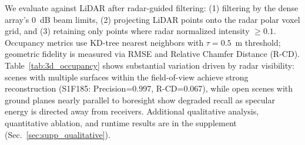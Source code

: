 We evaluate against LiDAR after radar-guided filtering: (1) filtering by the dense array's 0~dB beam limits, (2) projecting LiDAR points onto the radar polar voxel grid, and (3) retaining only points where radar normalized intensity $\geq 0.1$. Occupancy metrics use KD-tree nearest neighbors with $\tau=0.5$~m threshold; geometric fidelity is measured via RMSE and Relative Chamfer Distance (R-CD). Table~\ref{tab:3d_occupancy} shows substantial variation driven by radar visibility: scenes with multiple surfaces within the field-of-view achieve strong reconstruction (S1F185: Precision=0.997, R-CD=0.067), while open scenes with ground planes nearly parallel to boresight show degraded recall as specular energy is directed away from receivers. Additional qualitative analysis, quantitative ablation, and runtime results are in the supplement (Sec.~\ref{sec:supp_qualitative}).
